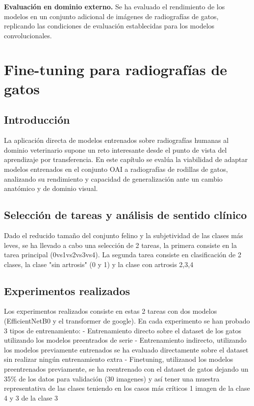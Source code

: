 \documentclass[11pt,spanish,listoffigures,listoftables]{tfgetsinf}
\begin{document}
\textbf{Evaluación en dominio externo.}
Se ha evaluado el rendimiento de los modelos en un conjunto adicional de imágenes de radiografías de gatos, replicando las condiciones de evaluación establecidas 
para los modelos convolucionales.


\chapter{Fine-tuning para radiografías de gatos}
\label{chap:gatos}

\section{Introducción}
La aplicación directa de modelos entrenados sobre radiografías humanas al dominio veterinario supone un reto interesante desde el punto de vista del aprendizaje por transferencia. En este capítulo se evalúa la viabilidad de adaptar modelos entrenados en el conjunto OAI a radiografías de rodillas de gatos, analizando su rendimiento y capacidad de generalización ante un cambio anatómico y de dominio visual.

\section{Selección de tareas y análisis de sentido clínico}
Dado el reducido tamaño del conjunto felino y la subjetividad de las clases más leves, se ha llevado a cabo una selección de 2 tareas, la primera consiste en la tarea principal (0vs1vs2vs3vs4). La segunda tarea consiste en clasificación de 2 clases, la clase "sin artrosis" (0 y 1)  y la clase con artrosis 2,3,4


\section{Experimentos realizados}

Los experimentos realizados consiste en estas 2 tareas con dos modelos (EfficientNetB0 y el transformer de google). En cada experimento se han probado 3 tipos de entrenamiento:
 - Entrenamiento directo sobre el dataset de los gatos utilizando los modelos preentrados de serie
 - Entrenamiento indirecto, utilizando los modelos previamente entrenados se ha evaluado directamente sobre el dataset sin realizar ningún entrenamiento extra
 - Finetuning, utilizanod los modelos preentrenados previamente, se ha reentrenado con el dataset de gatos dejando un 35\% de los datos para validación (30 imagenes) y así tener una muestra representativa de las clases teniendo en los casos más críticos 1 imagen de la clase 4 y 3 de la clase 3
\end{document}
